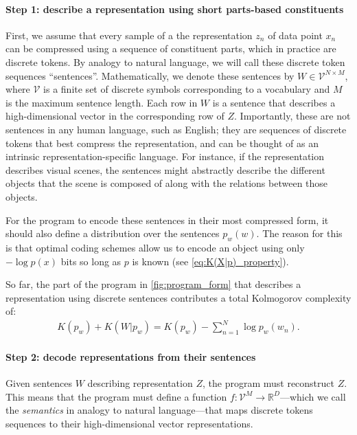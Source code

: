 \documentclass{article} %
\begin{document}
\paragraph{Step 1: describe a representation using short parts-based constituents}

First, we assume that every sample of a the representation $z_n$ of data point $x_n$ can be compressed using a sequence of constituent parts, which in practice are discrete tokens. By analogy to natural language, we will call these discrete token sequences ``sentences''. Mathematically, we denote these sentences by $W \in \mathcal{V}^{N \times M}$, where $\mathcal{V}$ is a finite set of discrete symbols corresponding to a vocabulary and $M$ is the maximum sentence length. Each row in $W$ is a sentence that describes a high-dimensional vector in the corresponding row of $Z$. Importantly, these are not sentences in any human language, such as English; they are sequences of discrete tokens that best compress the representation, and can be thought of as an intrinsic representation-specific language. For instance, if the representation describes visual scenes, the sentences might abstractly describe the different objects that the scene is composed of along with the relations between those objects.

For the program to encode these sentences in their most compressed form, it should also define a distribution over the sentences $p_w(w)$. The reason for this is that optimal coding schemes \citep[e.g., arithmetic coding][]{witten1987arithmetic} allow us to encode an object using only $-\log p(x)$ bits so long as $p$ is known (see \cref{eq:K(X|p)_property}).

So far, the part of the program in \cref{fig:program_form} that describes a representation using discrete sentences contributes a total Kolmogorov complexity of:
\begin{align*}
        K(p_w) + K(W|p_w) = K(p_w) - \sum_{n=1}^N \log p_w(w_n) .
\end{align*}

\paragraph{Step 2: decode representations from their sentences}

Given sentences $W$ describing representation $Z$, the program must reconstruct $Z$. This means that the program must define a function $f: \mathcal{V}^M \rightarrow \mathbb{R}^D$---which we call the \textit{semantics} in analogy to natural language---that maps discrete tokens sequences to their high-dimensional vector representations.
\end{document}
